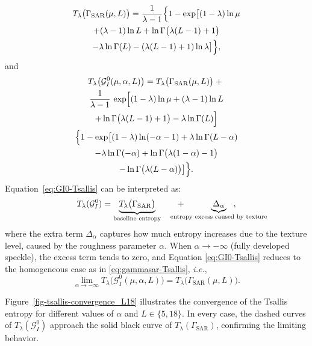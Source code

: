 \documentclass[
  lettersize  journal,
]{IEEEtran}%
\begin{document}
\begin{multline}
\label{eq:gammasar-Tsallis}
T_\lambda\bigl(\Gamma_{\mathrm{SAR}}(\mu, L)\bigr)=
\frac{1}{\lambda-1}\Bigl\{1-
\exp\bigl[
(1-\lambda)\ln\mu\\
+(\lambda-1)\ln L
+\ln\Gamma\bigl(\lambda(L-1)+1\bigr) \\
-\lambda\ln\Gamma(L)
-(\lambda(L-1)+1)\ln\lambda
\bigr]\Bigr\}, 
\end{multline} and \begin{multline}
\label{eq:GI0-Tsallis}
  T_\lambda\bigl(\mathcal{G}^0_I(\mu,\alpha,L)\bigr) = T_\lambda\bigl(\Gamma_{\mathrm{SAR}}(\mu, L)\bigr)\;+\;\\
  \frac{1}{\lambda-1}\,
  \exp\Bigl[
  (1-\lambda)\ln\mu
  +(\lambda-1)\ln L\\
  +\ln\Gamma\bigl(\lambda(L-1)+1\bigr)
  -\lambda\ln\Gamma(L)
  \Bigr] \\
  {}\Bigl\{1-
  \exp\bigl[
  (1-\lambda)\ln(-\alpha-1)
  +\lambda\ln\Gamma(L-\alpha)\\
  -\lambda\ln\Gamma(-\alpha) 
  +\ln\Gamma\bigl(\lambda(1-\alpha)-1\bigr)\\
  -\ln\Gamma\bigl(\lambda(L-\alpha)\bigr)
  \bigr]\Bigr\}.
\end{multline} Equation~\eqref{eq:GI0-Tsallis} can be interpreted as:
\begin{equation*}
  T_\lambda(\mathcal{G}^0_I)
  =
  \underbrace{T_\lambda \bigl(\Gamma_{\mathrm{SAR}}\bigr)}_{\text{baseline entropy}}
  \hspace{1.8em} + \hspace{-1.8em}
  \underbrace{\Delta_\alpha}_{\text{entropy excess caused by texture}}\hspace{-4.0em},
\end{equation*} where the extra term \(\Delta_\alpha\) captures how much
entropy increases due to the texture level, caused by the roughness
parameter \(\alpha\). When \(\alpha \to -\infty\) (fully developed
speckle), the excess term tends to zero, and Equation
\eqref{eq:GI0-Tsallis} reduces to the homogeneous case as in
\eqref{eq:gammasar-Tsallis}, \emph{i.e.}, \[
\lim_{\alpha \to -\infty} T_{\lambda}\bigl(\mathcal{G}^0_I(\mu, \alpha, L)\bigr) =  T_{\lambda}\bigl(\Gamma_{\mathrm{SAR}}(\mu, L)\bigr).
\]

Figure~\ref{fig-tsallis-convergence_L18} illustrates the convergence of
the Tsallis entropy for different values of \(\alpha\) and
\(L \in \{5,18\}\). In every case, the dashed curves of
\(T_\lambda(\mathcal{G}^0_I)\) approach the solid black curve of
\(T_\lambda(\Gamma_{\mathrm{SAR}})\), confirming the limiting behavior.
\end{document}
